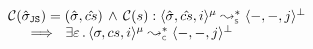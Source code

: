 \begin{corollary}\label{bug:finding:js}
$$
\begin{array}{l}
\compile(\sstate_\jssubscript) = (\sstate, \scs) \, \wedge \, 
  \compile(\jstmt) :  \transabssemrule{\sstate, \scs, i}{-, -, j}{\mode}{\bot}{\symbolic}  \\ \quad 
      \ \implies \  \exists \senv \, . \, \transabssemrule{\jstate, \cs, i}{-, -, j}{\mode}{\bot}{\concrete} 
\end{array}
$$
\end{corollary}

 
%
%
%
%
%
%
%


